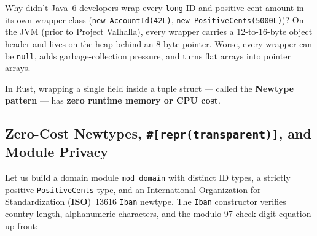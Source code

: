 Why didn't Java~6 developers wrap every \texttt{long} ID and positive cent amount in its own wrapper class (\texttt{new AccountId(42L)}, \texttt{new PositiveCents(5000L)})? On the JVM (prior to Project Valhalla), every wrapper carries a 12-to-16-byte object header and lives on the heap behind an 8-byte pointer. Worse, every wrapper can be \texttt{null}, adds garbage-collection pressure, and turns flat arrays into pointer arrays.

In Rust, wrapping a single field inside a tuple struct --- called the \textbf{Newtype pattern} --- has \textbf{zero runtime memory or CPU cost}.

\subsection{Zero-Cost Newtypes, \texttt{\#[repr(transparent)]}, and Module Privacy}

Let us build a domain module \texttt{mod domain} with distinct ID types, a strictly positive \texttt{PositiveCents} type, and an International Organization for Standardization (\textbf{ISO})~13616 \texttt{Iban} newtype. The \texttt{Iban} constructor verifies country length, alphanumeric characters, and the modulo-97 check-digit equation up front:

